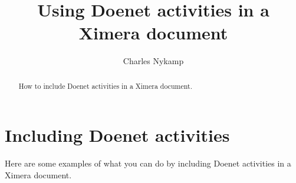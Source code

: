 \documentclass{ximera}
\title{Using Doenet activities in a Ximera document}
\author{Charles Nykamp}
\begin{document}
\begin{abstract}
  How to include Doenet activities in a Ximera document.
\end{abstract}
\maketitle
\label{xim:doenetDemo}

\section{Including Doenet activities}

Here are some examples of what you can do by including Doenet activities in a Ximera document.

\end{document}
